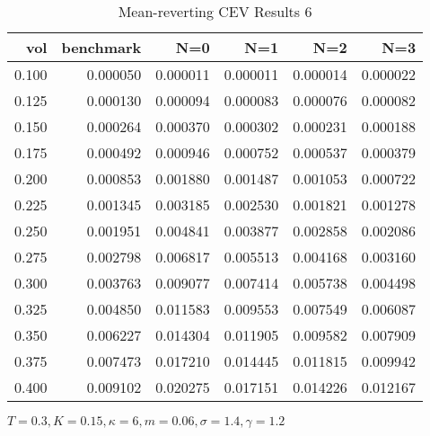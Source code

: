 \begin{table}[ht]
\centering
\caption{Mean-reverting CEV Results 6}
\begin{tabular}{rrrrrr}
\toprule
  vol &       benchmark &       N=0 &       N=1 &       N=2 &       N=3 \\
\midrule
0.100 & 0.000050 & 0.000011 & 0.000011 & 0.000014 & 0.000022 \\
0.125 & 0.000130 & 0.000094 & 0.000083 & 0.000076 & 0.000082 \\
0.150 & 0.000264 & 0.000370 & 0.000302 & 0.000231 & 0.000188 \\
0.175 & 0.000492 & 0.000946 & 0.000752 & 0.000537 & 0.000379 \\
0.200 & 0.000853 & 0.001880 & 0.001487 & 0.001053 & 0.000722 \\
0.225 & 0.001345 & 0.003185 & 0.002530 & 0.001821 & 0.001278 \\
0.250 & 0.001951 & 0.004841 & 0.003877 & 0.002858 & 0.002086 \\
0.275 & 0.002798 & 0.006817 & 0.005513 & 0.004168 & 0.003160 \\
0.300 & 0.003763 & 0.009077 & 0.007414 & 0.005738 & 0.004498 \\
0.325 & 0.004850 & 0.011583 & 0.009553 & 0.007549 & 0.006087 \\
0.350 & 0.006227 & 0.014304 & 0.011905 & 0.009582 & 0.007909 \\
0.375 & 0.007473 & 0.017210 & 0.014445 & 0.011815 & 0.009942 \\
0.400 & 0.009102 & 0.020275 & 0.017151 & 0.014226 & 0.012167 \\
\bottomrule
\end{tabular}
\small{$T=0.3,K=0.15, \kappa = 6,m=0.06, \sigma = 1.4, \gamma = 1.2$}
\end{table}

